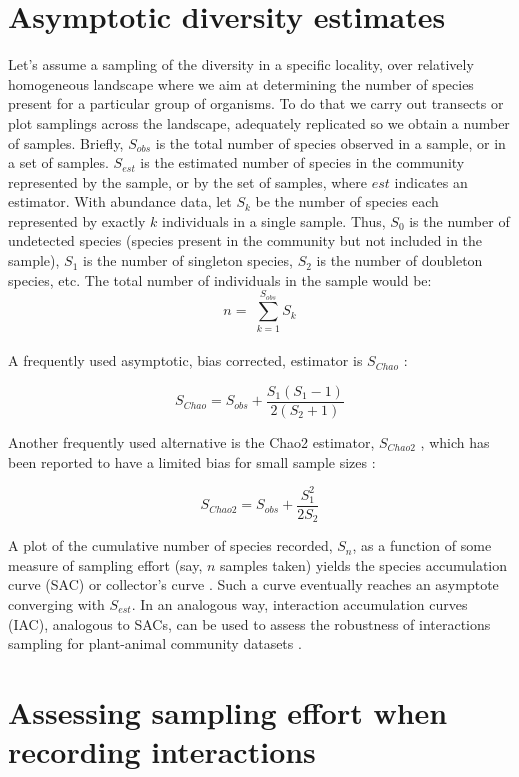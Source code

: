 \documentclass[a4paper,12pt]{article}
\begin{document}
\begin{spacing}{1.0}
\chapter{Asymptotic diversity estimates}
\label{asymptoticdiversityestimates}

Let's assume a sampling of the diversity in a specific locality, over relatively homogeneous landscape where we aim at determining the number of species present for a particular group of organisms. To do that we carry out transects or plot samplings across the landscape, adequately replicated so we obtain a number of samples. Briefly, $S_{obs}$ is the total number of species observed in a sample, or in a set of samples. $S_{est}$ is the estimated number of species in the community represented by the sample, or by the set of samples, where $est$ indicates an estimator. With abundance data, let $S_k$ be the number of species each represented by exactly $k$ individuals in a single sample. Thus, $S_0$ is the number of undetected species (species present in the community but not included in the sample), $S_1$ is the number of singleton species, $S_2$ is the number of doubleton species, etc. The total number of individuals in the sample would be:\\
$$n = 􏰢\sum_{k=1}^{S_{obs}}S_k$$\\
A frequently used asymptotic, bias corrected, estimator is $S_{Chao}$ \citep{Hortal:2006dc}\citep{Chao:2005wp}\citep{Colwell:2009}: 

$$S_{Chao}= S_{obs} + \frac{S_1 (S_1 −1)}{2(S_2 +1)}$$ 

Another frequently used alternative is the Chao2 estimator, $S_{Chao2}$ \citep{Gotelli:2001uo}, which has been reported to have a limited bias for small sample sizes \citep{Colwell:1994vt}\citep{Chao:2005wp}: 

$$S_{Chao2}= S_{obs} + \frac{S_1^2}{2S_2}$$ 

A plot of the cumulative number of species recorded, $S_n$, as a function of some measure of sampling effort (say, $n$ samples taken) yields the species accumulation curve (SAC) or collector's curve \citep{Colwell:1994vt}. Such a curve eventually reaches an asymptote converging with $S_{est}$. In an analogous way, interaction accumulation curves (IAC), analogous to SACs, can be used to assess the robustness of interactions sampling for plant-animal community datasets \citep{E31/2562}\citep{Jordano:2009c}\citep{Olesen:2011a}. 

\chapter{Assessing sampling effort when recording interactions}
\label{assessingsamplingeffortwhenrecordinginteractions}


\end{spacing}
\end{document}
